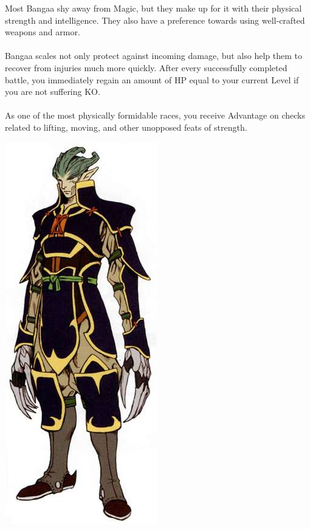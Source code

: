 Most Bangaa shy away from Magic, but they make up for it with their physical strength and intelligence.
They also have a preference towards using well-crafted weapons and armor.
%
\\\\
%
 Bangaa scales not only protect against incoming damage, but also help them to recover from injuries much more quickly.
After every successfully completed battle, you immediately regain an amount of HP equal to your current Level if you are not suffering KO. 
%
\\\\
%
 As one of the most physically formidable races, you receive Advantage on checks related to lifting, moving, and other unopposed feats of strength.
%
%
\newpage
%
%
%
\begin{center} \includegraphics[width=0.5\columnwidth]{./art/races/guado.jpg} \end{center}
